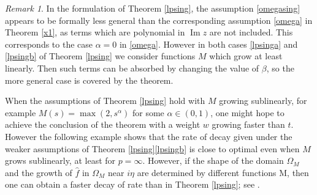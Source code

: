 \documentclass[11pt]{amsart}
\theoremstyle{definition}
\theoremstyle{remark}
\newtheorem{remark}[theorem]{Remark}
\numberwithin{equation}{section}
\begin{document}
\begin{remark}  In the formulation of Theorem \ref{lpsing}, the assumption \eqref{omegasing} appears to be formally less general than the corresponding assumption \eqref{omega} in Theorem \ref{x1}, as terms which are polynomial in ${\operatorname{Im}} z$ are not included. This corresponds to the case $\alpha=0$ in \eqref{omega}. However in both cases \eqref{lpsinga} and \eqref{lpsingb} of Theorem \ref{lpsing} we consider functions $M$ which grow at least linearly.  Then such terms can be absorbed by changing the value of $\beta$, so the more general case is covered by the theorem.
\end{remark}

When the assumptions of Theorem \ref{lpsing} hold with $M$ growing sublinearly, for example $M(s) = \max(2,s^\alpha)$ for some $\alpha \in (0,1)$, one might hope to achieve the conclusion of the theorem with a weight $w$ growing faster than $t$.  However the following example shows that the rate of decay given under the weaker assumptions of Theorem \ref{lpsing}\eqref{lpsingb} is close to optimal even when $M$ grows sublinearly, at least for $p=\infty$.  However, if  the shape of the domain $\Omega_M$ and the growth of $\widehat f$ in $\Omega_M$ near $i\eta$ are determined by different functions M, then one can obtain a faster decay of rate than in Theorem \ref{lpsing}; see \cite[Proposition 4.3]{BaDu}.
\end{document}

